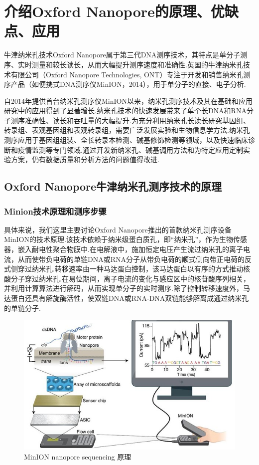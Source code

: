 \section{介绍Oxford Nanopore的原理、优缺点、应用}


牛津纳米孔技术Oxford Nanopore属于第三代DNA测序技术，其特点是单分子测序、实时测量和较长读长，从而大幅提升测序速度和准确性.英国的牛津纳米孔技术有限公司（Oxford Nanopore Technologies, ONT）专注于开发和销售纳米孔测序产品（如便携式DNA测序仪MinION，2014）\cite{1deamer2016three}\cite{2jain2016oxford}，用于单分子的直接、电子分析.

自2014年提供首台纳米孔测序仪MinION以来，纳米孔测序技术及其在基础和应用研究中的应用得到了显著增长.纳米孔技术的快速发展带来了单个长DNA和RNA分子测序准确性、读长和吞吐量的大幅提升.为充分利用纳米孔长读长研究基因组、转录组、表观基因组和表观转录组，需要广泛发展实验和生物信息学方法.纳米孔测序应用于基因组组装、全长转录本检测、碱基修饰检测等领域，以及快速临床诊断和疫情监测等专门领域.通过开发新纳米孔、碱基调用方法和为特定应用定制实验方案，仍有数据质量和分析方法的问题值得改进.

\subsection{Oxford Nanopore牛津纳米孔测序技术的原理}

\subsubsection{Minion技术原理和测序步骤}
具体来说，我们这里主要讨论Oxford Nanopore推出的首款纳米孔测序设备MinION的技术原理.该技术依赖于纳米级蛋白质孔，即“纳米孔”，作为生物传感器，嵌入耐电性聚合物膜中.在电解液中，施加恒定电压产生流过纳米孔的离子电流，从而使带负电荷的单链DNA或RNA分子从带负电荷的顺式侧向带正电荷的反式侧穿过纳米孔.转移速率由一种马达蛋白控制，该马达蛋白以有序的方式推动核酸分子穿过纳米孔.在易位期间，离子电流的变化与感应区中的核苷酸序列相关，并利用计算算法进行解码，从而实现单分子的实时测序.除了控制转移速度外，马达蛋白还具有解旋酶活性，使双链DNA或RNA-DNA双链能够解离成通过纳米孔的单链分子.

\begin{figure}[htp!]
	\centering
	\includegraphics[width=0.8\linewidth]{figure/1mini}
	\caption{MinION nanopore sequencing 原理 \cite{0wang2021nanopore}} \label{MinION}
\end{figure}

